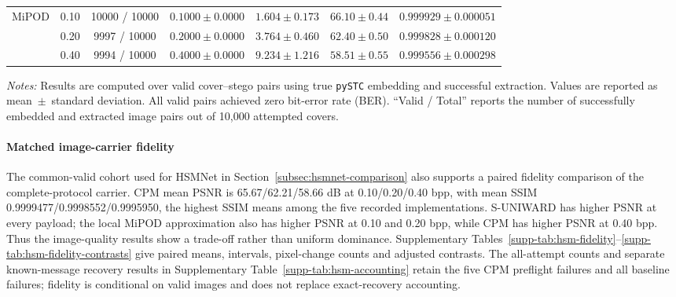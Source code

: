 \documentclass[pdflatex,sn-mathphys-num]{sn-jnl}%
\theoremstyle{definition}
\theoremstyle{game}
\theoremstyle{thmstyleone}%
\theoremstyle{thmstyletwo}%
\theoremstyle{thmstylethree}%
\begin{document}
\begin{table}[!t]
{\begin{threeparttable}
\begin{tabular}{
@{}
ll
c
c
c
c
c
@{}}
\multirow{3}{*}{MiPOD}
& 0.10 & 10000 / 10000 & $0.1000 \pm 0.0000$ & $ 1.604 \pm 0.173$ & $66.10 \pm 0.44$ & $0.999929 \pm 0.000051$ \\
& 0.20 &  9997 / 10000 & $0.2000 \pm 0.0000$ & $ 3.764 \pm 0.460$ & $62.40 \pm 0.50$ & $0.999828 \pm 0.000120$ \\
& 0.40 &  9994 / 10000 & $0.4000 \pm 0.0000$ & $ 9.234 \pm 1.216$ & $58.51 \pm 0.55$ & $0.999556 \pm 0.000298$ \\
\bottomrule
\end{tabular}

\begin{tablenotes}
\footnotesize
\item \textit{Notes:} Results are computed over valid cover--stego pairs using true \texttt{pySTC} embedding and successful extraction. Values are reported as mean~$\pm$~standard deviation. All valid pairs achieved zero bit-error rate (BER). ``Valid / Total'' reports the number of successfully embedded and extracted image pairs out of 10,000 attempted covers.
\end{tablenotes}

\end{threeparttable}%
}

\end{table}


\paragraph{Matched image-carrier fidelity}\label{par:matched-image-fidelity}
The common-valid cohort used for HSMNet in
Section~\ref{subsec:hsmnet-comparison} also supports a paired fidelity
comparison of the complete-protocol carrier. CPM mean PSNR is 65.67/62.21/58.66 dB
at 0.10/0.20/0.40 bpp, with mean SSIM
0.9999477/0.9998552/0.9995950, the highest SSIM means among the five
recorded implementations. S-UNIWARD has higher PSNR at every payload;
the local MiPOD approximation also has higher PSNR at 0.10 and 0.20 bpp,
while CPM has higher PSNR at 0.40 bpp. Thus the image-quality results
show a trade-off rather than uniform dominance. Supplementary
Tables~\ref{supp-tab:hsm-fidelity}--\ref{supp-tab:hsm-fidelity-contrasts}
give paired means, intervals, pixel-change counts and adjusted contrasts.
The all-attempt counts and separate known-message recovery results in
Supplementary Table~\ref{supp-tab:hsm-accounting} retain the five CPM
preflight failures and all baseline failures; fidelity is conditional on
valid images and does not replace exact-recovery accounting.
\end{document}
